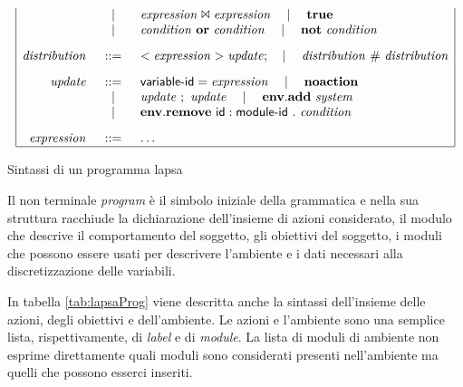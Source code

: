 \begin{table}
$$\begin{array}{|rcl|}
	& \quad\mid\quad & \mathit{expression} \Join \mathit{expression} \quad\mid\quad \mathbf{true} \\
	& \quad\mid\quad & \mathit{condition} \mbox{ } \mathbf{or} \mbox{ } \mathit{condition} \quad\mid\quad \mathbf{not} \mbox{ } \mathit{condition}
	\\[.3cm]
\mathit{distribution} &::=& <\mathit{expression}> \mathit{update}; \quad\mid\quad \mathit{distribution} \mbox{ } \# \mbox{ } \mathit{distribution}
	\\[.3cm]
\mathit{update} &::=& {\sf variable}\textrm{-}{\sf id} = \mathit{expression} \quad\mid\quad \mathbf{noaction} \\
	& \quad\mid\quad & \mathit{update} \mbox{ } ; \mbox{ } \mathit{update} \quad\mid\quad \mathbf{env.add} \mbox{ } \mathit{system} \\
	& \quad\mid\quad & \mathbf{env.remove} \mbox{ } {\sf id}:{\sf module}\textrm{-}{\sf id} \mbox{ } . \mbox{ } \mathit{condition} 
	\\[.3cm]
\mathit{expression} &::=& \dots
	\\
\hline
\end{array}
$$
\label{tab:lapsaProg} %
\caption{Sintassi di un programma \ac{lapsa}}
\end{table}

Il non terminale \emph{program} è il simbolo iniziale della grammatica e nella sua struttura racchiude la dichiarazione dell'insieme di azioni considerato, il modulo che descrive il comportamento del soggetto, gli obiettivi del soggetto, i moduli che possono essere usati per descrivere l'ambiente e i dati necessari alla discretizzazione delle variabili.

In tabella \ref{tab:lapsaProg} viene descritta anche la sintassi dell'insieme delle azioni, degli obiettivi e dell'ambiente. Le azioni e l'ambiente sono una semplice lista, rispettivamente, di \emph{label} e di \emph{module}. La lista di moduli di ambiente non esprime direttamente quali moduli sono considerati presenti nell'ambiente ma quelli che possono esserci inseriti.


